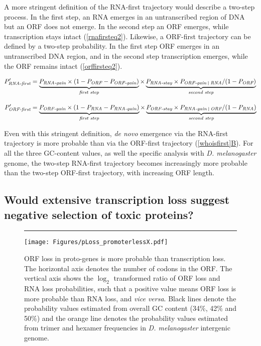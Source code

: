 \documentclass[12pt,a4paper]{article}
\newcommand{\cmnt}[1]{{\color{purple} #1}}
\begin{document}
A more stringent definition of the RNA-first trajectory would describe a two-step process. In the first step, an RNA emerges in an untranscribed region of DNA but an ORF does not emerge. In the second step an ORF emerges, while transcription stays intact (\autoref{rnafirsteq2}). Likewise, a ORF-first trajectory can be defined by a two-step probability. In the first step ORF emerges in an untranscribed DNA region, and in the second step transcription emerges, while the ORF remains intact (\autoref{orffirsteq2}).

\begin{align}
P_\textit{RNA-first}' & = \underbrace{P_\textit{RNA-gain} \times (1-P_\textit{ORF} -P_\textit{ORF-gain})}_\textit{first step} \times \underbrace{P_\textit{RNA-stay}\times P_\textit{ORF-gain \vline\ RNA}/(1-P_\textit{ORF})}_\textit{second step} \label{rnafirsteq2} \\[1em]
P_\textit{ORF-first}' & = \underbrace{P_\textit{ORF-gain} \times (1-P_\textit{RNA} -P_\textit{RNA-gain})}_\textit{first step} \times \underbrace{P_\textit{ORF-stay}\times P_\textit{RNA-gain \vline\ ORF}/(1-P_\textit{RNA})}_\textit{second step} \label{orffirsteq2}
\end{align}

\cmnt{Even with this stringent definition, \textit{de novo} emergence via the RNA-first trajectory is more probable than via the ORF-first trajectory (\hyperref[whoisfirst]{\autoref{whoisfirst}B}). For all the three GC-content values, as well the specific analysis with \textit{D. melanogaster} genome, the two-step RNA-first trajectory becomes increasingly more probable than the two-step ORF-first trajectory, with increasing ORF length.}


\subsection{Would extensive transcription loss suggest negative selection of toxic proteins?}


\begin{figure}[!b]
\centering
\hrule
\vspace{1ex}
\texttt{[image: Figures/pLoss\_promoterlessX.pdf]}
\caption{ORF loss in proto-genes is more probable than transcription loss. The horizontal axis denotes the number of codons in the ORF. The vertical axis shows the $\log_2$ transformed ratio of ORF loss and RNA loss probabilities, such that a positive value means ORF loss is more probable than RNA loss, and \textit{vice versa}. Black lines denote the probability values estimated from overall GC content (34\%, 42\% and 50\%) and the orange line denotes the probability values estimated from trimer and hexamer frequencies in \textit{D. melanogaster} intergenic genome.}
\label{lossprob}
\end{figure}
\end{document}
